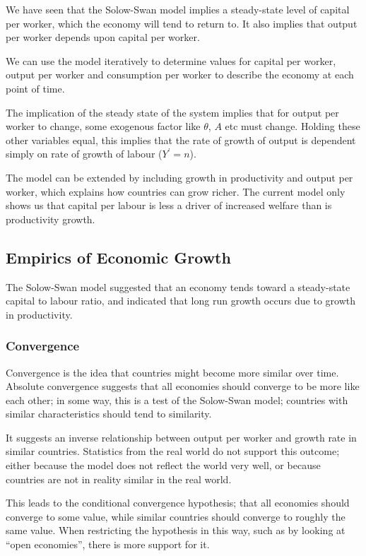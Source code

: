 \documentclass[12pt]{report}
\begin{document}
\begin{flushleft}
We have seen that the Solow-Swan model implies a steady-state level of capital
per worker, which the economy will tend to return to. It also implies that
output per worker depends upon capital per worker. \par
We can use the model iteratively to determine values for capital per worker,
output per worker and consumption per worker to describe the economy at each
point of time. \par
The implication of the steady state of the system implies that for output
per worker to change, some exogenous factor like \(\theta\), \(A\) etc must
change. Holding these other variables equal, this implies that the rate of
growth of output is dependent simply on rate of growth of labour
(\(Y^\prime = n\)). \par
The model can be extended by including growth in productivity and output per
worker, which explains how countries can grow richer. The current model only
shows us that capital per labour is less a driver of increased welfare than is
productivity growth.

\subsection*{Empirics of Economic Growth}

The Solow-Swan model suggested that an economy tends toward a steady-state
capital to labour ratio, and indicated that long run growth occurs due to
growth in productivity.

\subsubsection*{Convergence}

Convergence is the idea that countries might become more similar over time.
Absolute convergence suggests that all economies should converge to be more
like each other; in some way, this is a test of the Solow-Swan model; countries
with similar characteristics should tend to similarity. \par
It suggests an inverse relationship between output per worker and growth rate
in similar countries. Statistics from the real world do not support this
outcome; either because the model does not reflect the world very well, or
because countries are not in reality similar in the real world. \par
This leads to the conditional convergence hypothesis; that all economies should
converge to some value, while similar countries should converge to roughly
the same value. When restricting the hypothesis in this way, such as by looking
at ``open economies'', there is more support for it.


\end{flushleft}
\end{document}
